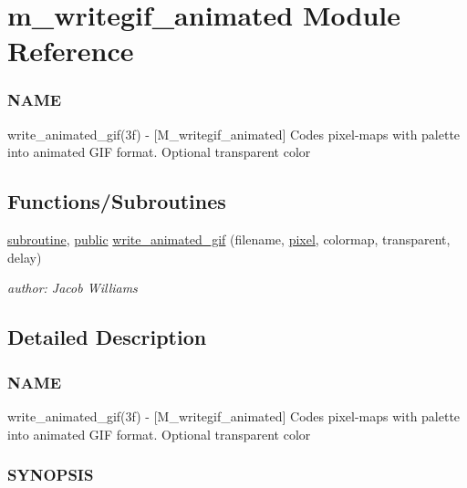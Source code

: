 \hypertarget{namespacem__writegif__animated}{}\section{m\+\_\+writegif\+\_\+animated Module Reference}
\label{namespacem__writegif__animated}


\subsubsection*{N\+A\+ME}

write\+\_\+animated\+\_\+gif(3f) -\/ \mbox{[}M\+\_\+writegif\+\_\+animated\mbox{]} Codes pixel-\/maps with palette into animated G\+IF format. Optional transparent color  


\subsection*{Functions/\+Subroutines}
\begin{DoxyCompactItemize}
\item 
\hyperlink{M__stopwatch_83_8txt_acfbcff50169d691ff02d4a123ed70482}{subroutine}, \hyperlink{M__stopwatch_83_8txt_a2f74811300c361e53b430611a7d1769f}{public} \hyperlink{namespacem__writegif__animated_a3da6a5c71a9d9e1f49aa075adc6629bd}{write\+\_\+animated\+\_\+gif} (filename, \hyperlink{shell_8f90_a5c599e945a5e0c9c8954969ea48587cf}{pixel}, colormap, transparent, delay)
\begin{DoxyCompactList}\small\item\em author\+: Jacob Williams \end{DoxyCompactList}\end{DoxyCompactItemize}


\subsection{Detailed Description}
\subsubsection*{N\+A\+ME}

write\+\_\+animated\+\_\+gif(3f) -\/ \mbox{[}M\+\_\+writegif\+\_\+animated\mbox{]} Codes pixel-\/maps with palette into animated G\+IF format. Optional transparent color 

\subsubsection*{S\+Y\+N\+O\+P\+S\+IS}


